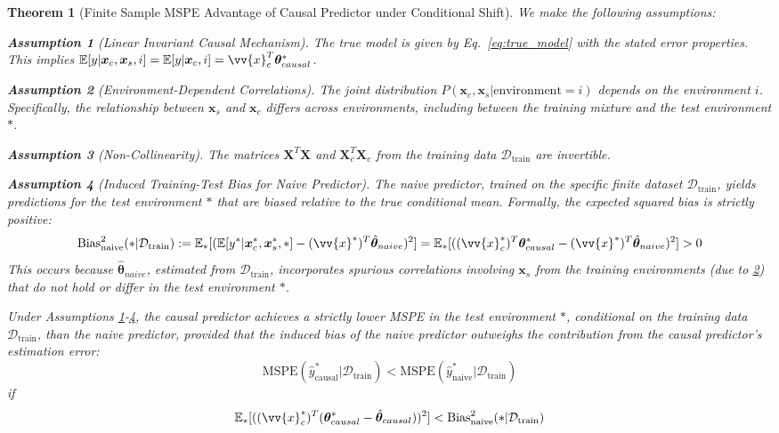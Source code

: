 \documentclass{article}
\newtheorem{theorem}{Theorem}
\newtheorem{assumption}{Assumption}
\newcommand{\covarcausevec}{\bm{x}_c}            %
\newcommand{\covarsympvec}{\bm{x}_s}            %
\newcommand{\covarcausevecaug}{\vv{x}_c}           %
\newcommand{\covarvecaugtest}{\vv{x}^*}             %
\newcommand{\covarcausevecaugtest}{\vv{x}_c^*}         %
\newcommand{\envidx}{i}                         %
\newcommand{\param}{\theta}                     %
\newcommand{\paramvec}{\bm{\param}}             %
\newcommand{\paramtruecausal}{\paramvec_{causal}^*} %
\newcommand{\paramhatcausal}{\hat{\paramvec}_{causal}} %
\newcommand{\paramhatnaive}{\hat{\paramvec}_{naive}} %
\newcommand{\envtest}{*}                        %
\newcommand{\dataset}{\mathcal{D}}              %
\newcommand{\datasettrain}{\dataset_{\text{train}}} %
\newcommand{\datatrainmat}{\mathbf{X}}          %
\newcommand{\datatrainmatcause}{\mathbf{X}_c}   %
\newcommand{\prednaive}{\hat{y}_{\text{naive}}^*} %
\newcommand{\predcausal}{\hat{y}_{\text{causal}}^*} %
\newcommand{\Expect}{\mathbb{E}}                %
\newcommand{\MSPE}{\mathrm{MSPE}}               %
\begin{document}
\begin{theorem}[Finite Sample MSPE Advantage of Causal Predictor under Conditional Shift]
We make the following assumptions:
\begin{assumption}[Linear Invariant Causal Mechanism]
\label{ass:A1}
The true model is given by Eq.~\eqref{eq:true_model} with the stated error properties. This implies $\Expect[y | \covarcausevec, \covarsympvec, \envidx] = \Expect[y | \covarcausevec, \envidx] = \covarcausevecaug^T \paramtruecausal$.
\end{assumption}
\begin{assumption}[Environment-Dependent Correlations]
\label{ass:A2}
The joint distribution $P(\covarcausevec, \covarsympvec | \text{environment}=\envidx)$ depends on the environment $\envidx$. Specifically, the relationship between $\covarsympvec$ and $\covarcausevec$ differs across environments, including between the training mixture and the test environment $\envtest$.
\end{assumption}
\begin{assumption}[Non-Collinearity]
\label{ass:A3}
The matrices $\datatrainmat^T \datatrainmat$ and $\datatrainmatcause^T \datatrainmatcause$ from the training data $\datasettrain$ are invertible.
\end{assumption}
\begin{assumption}[Induced Training-Test Bias for Naive Predictor]
\label{ass:A4}
The naive predictor, trained on the specific finite dataset $\datasettrain$, yields predictions for the test environment $\envtest$ that are biased relative to the true conditional mean. Formally, the expected squared bias is strictly positive:
\[ \text{Bias}^2_{\text{naive}}(\envtest | \datasettrain) := \Expect_{\envtest}[ (\Expect[y^*|\covarcausevec^*, \covarsympvec^*, \envtest] - (\covarvecaugtest)^T \paramhatnaive)^2 ] = \Expect_{\envtest}[ ((\covarcausevecaugtest)^T \paramtruecausal - (\covarvecaugtest)^T \paramhatnaive)^2 ] > 0 \]
This occurs because $\paramhatnaive$, estimated from $\datasettrain$, incorporates spurious correlations involving $\covarsympvec$ from the training environments (due to \ref{ass:A2}) that do not hold or differ in the test environment $\envtest$.
\end{assumption}

Under Assumptions \ref{ass:A1}-\ref{ass:A4}, the causal predictor achieves a strictly lower MSPE in the test environment $\envtest$, conditional on the training data $\datasettrain$, than the naive predictor, provided that the induced bias of the naive predictor outweighs the contribution from the causal predictor's estimation error:
\[ \MSPE(\predcausal | \datasettrain) < \MSPE(\prednaive | \datasettrain) \]
if
\[ \Expect_{\envtest}[ ((\covarcausevecaugtest)^T (\paramtruecausal - \paramhatcausal))^2 ] < \text{Bias}^2_{\text{naive}}(\envtest | \datasettrain) \]

\end{theorem}
\end{document}
